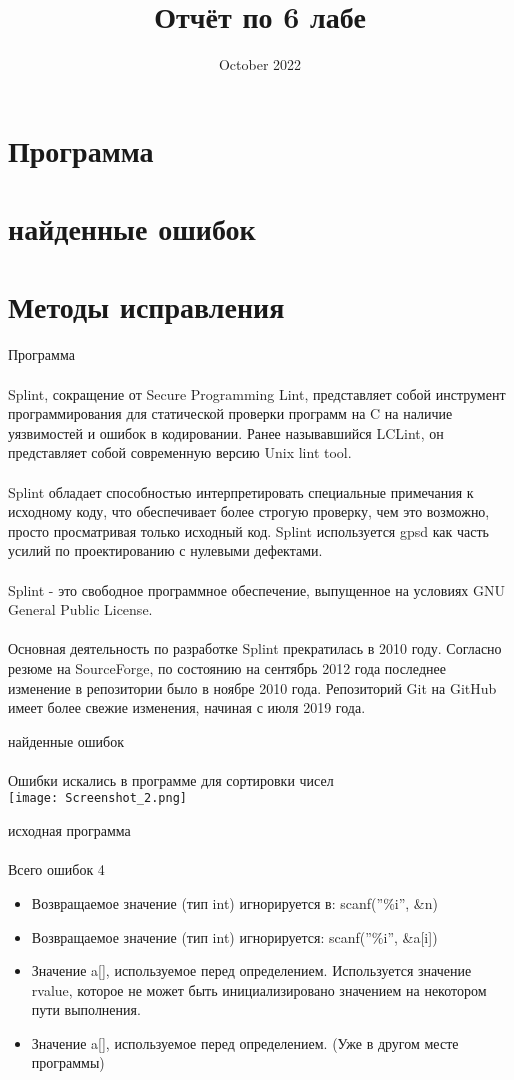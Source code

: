 \documentclass{article}
\title{Отчёт по 6 лабе}
\date{October 2022}
\begin{document}
\maketitle

\section{Программа}
\section{найденные ошибок}
\section{Методы исправления}

\newpage
\huge {Программа} \\ \\
\large{Splint, сокращение от Secure Programming Lint, представляет собой инструмент программирования для статической проверки программ на C на наличие уязвимостей и ошибок в кодировании. Ранее называвшийся LCLint, он представляет собой современную версию Unix lint tool.
\\ \\
Splint обладает способностью интерпретировать специальные примечания к исходному коду, что обеспечивает более строгую проверку, чем это возможно, просто просматривая только исходный код. Splint используется gpsd как часть усилий по проектированию с нулевыми дефектами.
\\ \\
Splint - это свободное программное обеспечение, выпущенное на условиях GNU General Public License.
\\ \\
Основная деятельность по разработке Splint прекратилась в 2010 году. Согласно резюме на SourceForge, по состоянию на сентябрь 2012 года последнее изменение в репозитории было в ноябре 2010 года. Репозиторий Git на GitHub имеет более свежие изменения, начиная с июля 2019 года.}

\newpage
\huge{найденные ошибок} \\ \\
\large{Ошибки искались в программе для сортировки чисел}
\\
\texttt{[image: Screenshot\_2.png]}

исходная программа
\\ \\
\newpage
\Large{Всего ошибок 4}
\begin{itemize}
    \item Возвращаемое значение (тип int) игнорируется в: scanf(''\%i'', \&n)
    \item Возвращаемое значение (тип int) игнорируется: scanf(''\%i'', \&a[i])
    \item Значение a[], используемое перед определением.  Используется значение rvalue, которое не может быть инициализировано значением на некотором пути выполнения.
    \item Значение a[], используемое перед определением. (Уже в другом месте программы)
\end{itemize}
\end{document}

